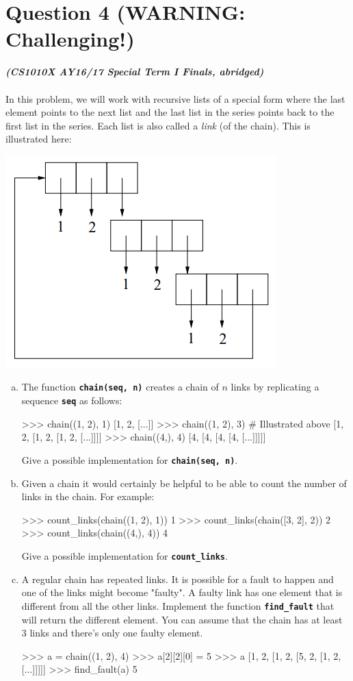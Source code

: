 \section{Question 4 (WARNING: Challenging!)}
\textbf{\textit{(CS1010X AY16/17 Special Term I Finals, abridged)}} \\ \\
In this problem, we will work with recursive lists of a special form where the last element points
to the next list and the last list in the series points back to the first list in the series. Each list is
also called a \textit{link} (of the chain). This is illustrated here:
\begin{center}
\includegraphics[scale=0.9]{chain.png}
\end{center}
\begin{enumerate}[(a)]
\item The function \texttt{\bfseries chain(seq, n)} creates a chain of $n$ links by replicating a 
sequence \texttt{\bfseries seq} as follows:
\begin{python}
>>> chain((1, 2), 1)
[1, 2, [...]]
>>> chain((1, 2), 3) # Illustrated above
[1, 2, [1, 2, [1, 2, [...]]]]
>>> chain((4,), 4)
[4, [4, [4, [4, [...]]]]]
\end{python}
Give a possible implementation for \texttt{\bfseries chain(seq, n)}.

\item Given a chain it would certainly be helpful to be able to count the number of links in the
chain. For example:
\begin{python}
>>> count_links(chain((1, 2), 1))
1
>>> count_links(chain([3, 2], 2))
2
>>> count_links(chain((4,), 4))
4
\end{python}
Give a possible implementation for \texttt{\bfseries count\_links}.

\item A regular chain has repeated links. It is possible for a fault to happen and one of the links
might become "faulty". A faulty link has one element that is different from all the other links.
Implement the function \texttt{\bfseries find\_fault} that will return the different element. You can assume that
the chain has at least 3 links and there’s only one faulty element.
\begin{python}
>>> a = chain((1, 2), 4)
>>> a[2][2][0] = 5
>>> a
[1, 2, [1, 2, [5, 2, [1, 2, [...]]]]]
>>> find_fault(a)
5
\end{python}
\end{enumerate}
